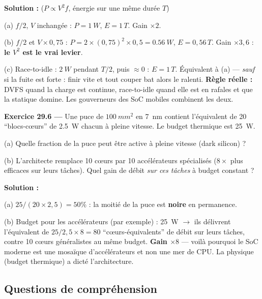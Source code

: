 \documentclass[12pt,a4paper,twoside]{book}
\begin{document}
\begin{pratique}
\textbf{Solution :} ($P \propto V^2 f$, énergie sur une même durée $T$)

(a) $f/2$, $V$ inchangée : $P = \SI{1}{W}$, $E = 1\,T$. Gain $\times 2$.

(b) $f/2$ et $V\times0{,}75$ : $P = 2\times(0{,}75)^2\times0{,}5 = \SI{0.56}{W}$, $E = 0{,}56\,T$. Gain $\times 3{,}6$ : \textbf{le $V^2$ est le vrai levier}.

(c) Race-to-idle : $\SI{2}{W}$ pendant $T/2$, puis $\approx 0$ : $E = 1\,T$. Équivalent à (a) --- \textit{sauf} si la fuite est forte : finir vite et tout couper bat alors le ralenti. \textbf{Règle réelle :} DVFS quand la charge est continue, race-to-idle quand elle est en rafales et que la statique domine. Les gouverneurs des SoC mobiles combinent les deux.
\end{pratique}

\textbf{Exercice 29.6 ---} Une puce de $\SI{100}{mm^2}$ en \SI{7}{nm} contient l'équivalent de 20 ``blocs-cœurs'' de \SI{2.5}{W} chacun à pleine vitesse. Le budget thermique est \SI{25}{W}.

(a) Quelle fraction de la puce peut être active à pleine vitesse (dark silicon) ?

(b) L'architecte remplace 10 cœurs par 10 accélérateurs spécialisés ($8\times$ plus efficaces sur leurs tâches). Quel gain de débit \textit{sur ces tâches} à budget constant ?

\begin{pratique}
\textbf{Solution :}

(a) $25/(20\times2{,}5) = 50\%$ : la moitié de la puce est \textbf{noire} en permanence.

(b) Budget pour les accélérateurs (par exemple) : \SI{25}{W} $\to$ ils délivrent l'équivalent de $25/2{,}5 \times 8 = 80$ ``cœurs-équivalents'' de débit sur leurs tâches, contre 10 cœurs généralistes au même budget. \textbf{Gain $\times 8$} --- voilà pourquoi le SoC moderne est une mosaïque d'accélérateurs et non une mer de CPU. La physique (budget thermique) a dicté l'architecture.
\end{pratique}

\subsection*{Questions de compréhension}
\end{document}
